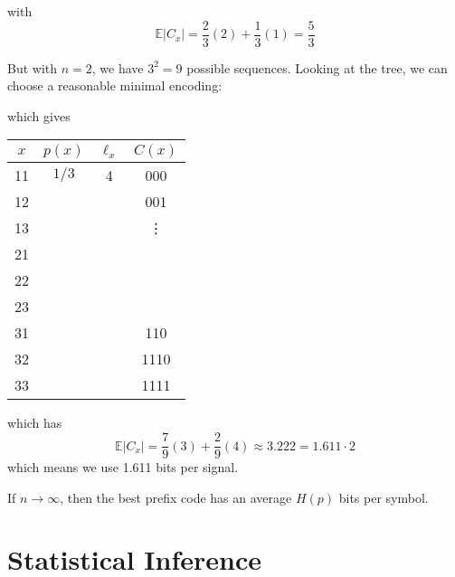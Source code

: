 \documentclass[12pt]{report}
\newcommand{\E}{\mathbb{E}}
\newcommand{\abs}[1]{\left\vert #1 \right\vert}
\begin{document}
with
\[\E\abs{C_x} = \frac{2}{3}(2) + \frac{1}{3}(1) = \frac{5}{3}\]

But with $n=2$, we have $3^2 = 9$ possible sequences. Looking at the tree, we can choose a reasonable minimal encoding:

\begin{center}
\end{center}

which gives
\qquad \begin{tabular}{cccc}
    $x$ & $p(x)$ & $\ell_x$ & $C(x)$ \\\hline
    11  & $1/3$  & 4        & 000    \\
    12  &        &          & 001    \\
    13  &        &          & \vdots \\
    21                               \\
    22                               \\
    23                               \\
    31  &        &          & 110    \\
    32  &        &          & 1110   \\
    33  &        &          & 1111
\end{tabular}

which has
\[\E\abs{C_x} = \frac{7}{9}(3) + \frac{2}{9}(4) \approx 3.222 = 1.611 \cdot 2\]
which means we use 1.611 bits per signal.

If $n \to \infty$, then the best prefix code has an average $H(p)$ bits per symbol.

\chapter{Statistical Inference}
\end{document}
